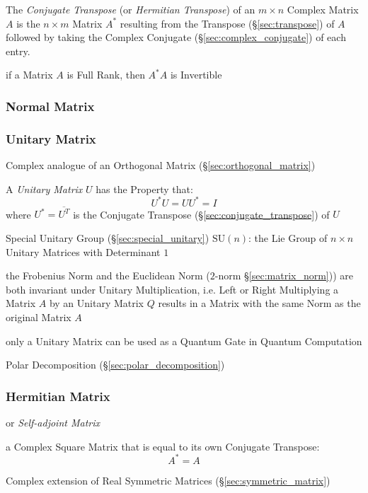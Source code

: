 The \emph{Conjugate Transpose} (or \emph{Hermitian Transpose}) of an $m \times
n$ Complex Matrix $A$ is the $n \times m$ Matrix $A^*$ resulting from the
Transpose (\S\ref{sec:transpose}) of $A$ followed by taking the Complex
Conjugate (\S\ref{sec:complex_conjugate}) of each entry.

if a Matrix $A$ is Full Rank, then $A^*A$ is Invertible



\subsubsection{Normal Matrix}\label{sec:normal_matrix}

\subsubsection{Unitary Matrix}\label{sec:unitary_matrix}

Complex analogue of an Orthogonal Matrix (\S\ref{sec:orthogonal_matrix})

A \emph{Unitary Matrix} $U$ has the Property that:
\[
  U^*U = UU^* = I
\]
where $U^* = \overline{U^T}$ is the Conjugate Transpose
(\S\ref{sec:conjugate_transpose}) of $U$

\fist Special Unitary Group (\S\ref{sec:special_unitary})
$\mathrm{SU}(n)$: the Lie Group of $n \times n$ Unitary Matrices with
Determinant $1$

the Frobenius Norm and the Euclidean Norm ($2$-norm \S\ref{sec:matrix_norm}))
are both invariant under Unitary Multiplication, i.e. Left or Right Multiplying
a Matrix $A$ by an Unitary Matrix $Q$ results in a Matrix with the same Norm as
the original Matrix $A$

only a Unitary Matrix can be used as a Quantum Gate in Quantum Computation

Polar Decomposition (\S\ref{sec:polar_decomposition})



\subsubsection{Hermitian Matrix}\label{sec:hermitian_matrix}

or \emph{Self-adjoint Matrix}

a Complex Square Matrix that is equal to its own Conjugate Transpose:
\[
  A^* = A
\]

Complex extension of Real Symmetric Matrices (\S\ref{sec:symmetric_matrix})

